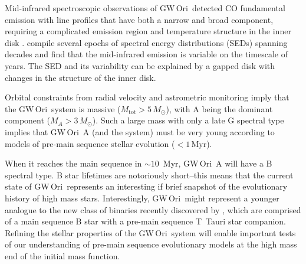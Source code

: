 \documentclass[twocolumn]{aastex61}
\newcommand{\todo}[1]{ \textcolor{red}{#1}}
\newcommand{\gw}{GW\,Ori}
\begin{document}
Mid-infrared spectroscopic observations of \gw\ detected CO fundamental emission with line profiles that have both a narrow and broad component, requiring a complicated emission region and temperature structure in the inner disk \citep{najita03}. \citet{fang14} compile several epochs of spectral energy distributions (SEDs) spanning decades and find that the mid-infrared emission is variable on the timescale of years. The SED and its variability can be explained by a gapped disk with changes in the structure of the inner disk.



Orbital constraints from radial velocity \citep{mathieu91,fang14} and astrometric \citep{berger11} monitoring imply that the \gw\ system is massive ($M_\mathrm{tot} > 5\,M_\odot$), with A being the dominant component ($M_A > 3\, M_\odot$). Such a large mass with only a late G spectral type implies that \gw\ A (and the system) must be very young according to models of pre-main sequence stellar evolution ($< 1$\,Myr).

When it reaches the main sequence in $\sim$$10\,$ Myr, \gw\ A will have a B spectral type. B star lifetimes are notoriously short--this means that the current state of \gw\ represents an interesting if brief snapshot of the evolutionary history of high mass stars. Interestingly, \gw\ might represent a younger analogue to the new class of binaries recently discovered by \citet{moe15}, which are comprised of a main sequence B star with a pre-main sequence T~Tauri star companion. Refining the stellar properties of the \gw\ system will enable important tests of our understanding of pre-main sequence evolutionary models at the high mass end of the initial mass function.
\end{document}
